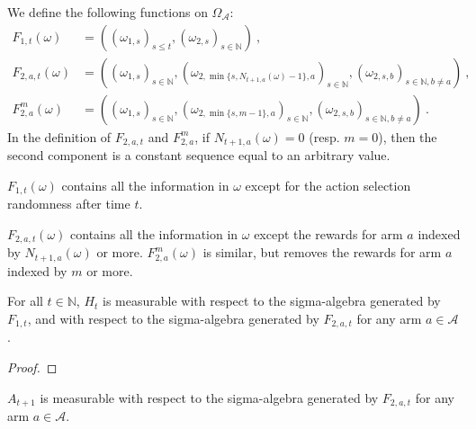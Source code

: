 \begin{definition}\label{def:AM.probSpaceSubsets}
  \leanok
We define the following functions on $\Omega_{\mathcal{A}}$:
\begin{align*}
  F_{1, t}(\omega) &= ((\omega_{1,s})_{s \le t}, (\omega_{2,s})_{s \in \mathbb{N}})
  \: , \\
  F_{2, a, t}(\omega) &= ((\omega_{1,s})_{s \in \mathbb{N}}, (\omega_{2, \min\{s,N_{t+1,a}(\omega)-1\}, a})_{s \in \mathbb{N}}, (\omega_{2, s, b})_{s \in \mathbb{N}, b \ne a})
  \: , \\
  F_{2, a}^m(\omega) &= ((\omega_{1,s})_{s \in \mathbb{N}}, (\omega_{2, \min\{s,m-1\}, a})_{s \in \mathbb{N}}, (\omega_{2, s, b})_{s \in \mathbb{N}, b \ne a})
  \: .
\end{align*}
In the definition of $F_{2, a, t}$ and $F_{2, a}^m$, if $N_{t+1,a}(\omega) = 0$ (resp. $m = 0$), then the second component is a constant sequence equal to an arbitrary value.

$F_{1, t}(\omega)$ contains all the information in $\omega$ except for the action selection randomness after time $t$.

$F_{2, a, t}(\omega)$ contains all the information in $\omega$ except the rewards for arm $a$ indexed by $N_{t+1,a}(\omega)$ or more.
$F_{2, a}^m(\omega)$ is similar, but removes the rewards for arm $a$ indexed by $m$ or more.
\end{definition}


\begin{lemma}\label{lem:AM.measurable_hist_comap}
\leanok
For all $t \in \mathbb{N}$, $H_t$ is measurable with respect to the sigma-algebra generated by $F_{1, t}$, and with respect to the sigma-algebra generated by $F_{2, a, t}$ for any arm $a \in \mathcal{A}$.
\end{lemma}

\begin{proof}\leanok

\end{proof}


\begin{lemma}\label{lem:AM.measurable_action_add_one_truePast}
  \leanok
$A_{t+1}$ is measurable with respect to the sigma-algebra generated by $F_{2, a, t}$ for any arm $a \in \mathcal{A}$.
\end{lemma}

